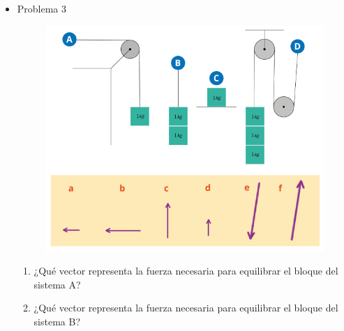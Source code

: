 \documentclass[11pt]{book}
\begin{document}
\begin{itemize}
          \newpage
    \item Problema 3
          \begin{boxK}
              \begin{figure}[H]
                  \centering
                  \includegraphics[width=0.9\linewidth]{poleas02.png}
              \end{figure}
              \begin{enumerate}
                  \item ¿Qué vector representa la fuerza necesaria para equilibrar el bloque
                        del sistema A?\\
                  \item ¿Qué vector representa la fuerza necesaria para equilibrar el bloque
                        del sistema B?\\
\end{enumerate}
\end{boxK}
\end{itemize}
\end{document}
